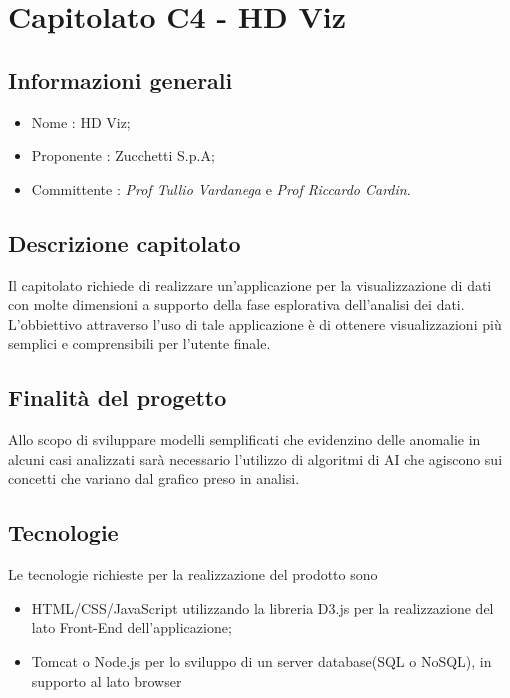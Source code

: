 \section{Capitolato C4 - HD Viz}

\subsection{Informazioni generali}

\begin{itemize}
\item Nome : HD Viz;
\item Proponente : Zucchetti S.p.A;
\item Committente : \emph{Prof Tullio Vardanega} e \emph{Prof Riccardo Cardin}.
\end{itemize}

\subsection{Descrizione capitolato}
Il capitolato richiede di realizzare un'applicazione per la
visualizzazione di dati con molte dimensioni a supporto della fase esplorativa
dell'analisi dei dati. L'obbiettivo attraverso l'uso di tale applicazione
è di ottenere visualizzazioni più semplici e comprensibili per l'utente finale. 

\subsection{Finalità del progetto}
Allo scopo di sviluppare modelli semplificati che evidenzino delle anomalie in alcuni casi analizzati sarà necessario l'utilizzo di algoritmi di AI che agiscono sui concetti che variano dal grafico preso in analisi.
 
\subsection{Tecnologie}
Le tecnologie richieste per la realizzazione del prodotto sono 
\begin{itemize}
\item HTML/CSS/JavaScript utilizzando la libreria D3.js per la realizzazione del lato Front-End dell'applicazione;
\item Tomcat o Node.js per lo sviluppo di un server database(SQL o NoSQL), in supporto al lato browser
\end{itemize}

